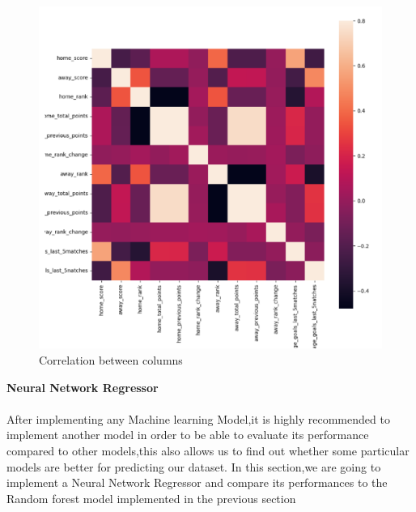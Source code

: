 \begin{figure}[h]
  \centering
  \includegraphics[width=0.8\linewidth]{NNLregressor.png}
  \caption{Correlation between columns}
\end{figure}
 
\noindent \textbf{Neural Network Regressor}\\
\\
After implementing any Machine learning Model,it is highly recommended to implement another model in order to be able to evaluate  its performance compared to other models,this also allows us to find out whether some particular models are better for predicting our dataset.
 In this section,we are going to implement a Neural Network Regressor and compare its performances to the Random forest model implemented in the previous section\\
\newpage

